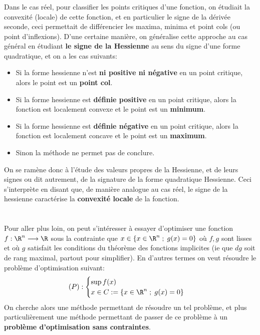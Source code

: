 \subsection*{}
Dans le cas réel, pour classifier les points critiques d'une fonction, on étudiait la convexité (locale) de cette fonction, et en particulier le signe de la dérivée seconde, ceci permettait de différencier les maxima, minima et point cols (ou point d'inflexions). D'une certaine manière, on généralise cette approche au cas général en étudiant \textbf{le signe de la Hessienne} au sens du signe d'une forme quadratique, et on a les cas suivants:
\begin{itemize}
   \item Si la forme hessienne n'est \textbf{ni positive ni négative} en un point critique, alors le point est un \textbf{point col}.

   \item Si la forme hessienne est \textbf{définie positive} en un point critique, alors la fonction est localement convexe et le point est un \textbf{minimum}.
   \item Si la forme hessienne est \textbf{définie négative} en un point critique, alors la fonction est localement concave et le point est un \textbf{maximum}.
   \item Sinon la méthode ne permet pas de conclure.
\end{itemize}
On se ramène donc à l'étude des valeurs propres de la Hessienne, et de leurs signes ou dit autrement, de la signature de la forme quadratique Hessienne. Ceci s'interprète en disant que, de manière analogue au cas réel, le signe de la hessienne caractérise la \textbf{convexité locale} de la fonction.
\chapter*{}
Pour aller plus loin, on peut s'intéresser à essayer d'optimiser une fonction \( f : \R^n \longrightarrow \R \) sous la contrainte que \(x \in \left\{ x \in \R^n \; ; \; g(x) = 0 \right\}\) où \( f, g \) sont lisses et où \( g \) satisfait les conditions du théorème des fonctions implicites (ie que \( dg \) soit de rang maximal, partout pour simplifier). En d'autres termes on veut résoudre le problème d'optimisation suivant:
\[ 
   (P) :\begin{cases}
      \sup f(x)\\
      x \in C := \left\{ x \in \R^n \; ; \; g(x) = 0 \right\} 
   \end{cases} 
\] 
On cherche alors une méthode permettant de résoudre un tel problème, et plus particulièrement une méthode permettant de passer de ce problème à un \textbf{problème d'optimisation sans contraintes}.
